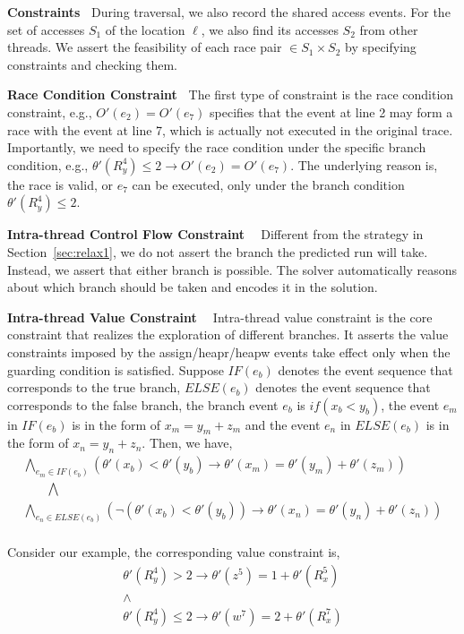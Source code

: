 {\bf Constraints\ } During traversal, we also record the shared access 
events.  For the set of accesses $S_1$ of the location $\ell$, we also 
find its accesses $S_2$ from other threads. We assert the feasibility 
of each race pair $\in S_1 \times S_2$ by specifying constraints and 
checking them.

{\bf Race Condition Constraint\ }  The first type of constraint is the 
race condition constraint, e.g., $O'(e_2)=O'(e_7)$ specifies that the event 
at line 2 may form a race with the event at line 7, which is actually not 
executed in the original trace. Importantly, we need to specify the race 
condition under the specific branch condition, e.g., 
$\theta'(R^4_y)\leq 2\rightarrow O'(e_2)=O'(e_7)$. The underlying reason is, 
the race is valid, or $e_7$ can be executed,  only under the branch condition $\theta'(R^4_y)\leq 2$. 

{\bf Intra-thread Control Flow Constraint \ } Different from the strategy in Section~\ref{sec:relax1}, we do not assert the branch the predicted run will take. Instead, we assert that either branch is possible.
The solver automatically reasons about which branch should be taken and encodes it in the solution. 

{\bf Intra-thread Value Constraint \ } Intra-thread value constraint is the 
core constraint that realizes the exploration of different branches. It 
asserts the value constraints imposed by the {\sf assign/heapr/heapw} events 
take effect only when the guarding condition is satisfied. 
Suppose $IF(e_b)$ denotes the event sequence that corresponds to the 
true branch, $ELSE(e_b)$ denotes the event sequence that corresponds to 
the false branch, the branch event $e_b$ is  $if(x_b<y_b)$, the event $e_m$ 
in $IF(e_b)$ is in the form of $x_m=y_m+z_m$ and the 
event $e_n$ in $ELSE(e_b)$ is in the form of $x_n=y_n+z_n$. Then, we have,
$$
\begin{array}{l}
\bigwedge\limits_{e_m \in IF(e_b)} (\theta'(x_b) < \theta'(y_b) \rightarrow  \theta'(x_m)=\theta'(y_m)+\theta'(z_m)) \\ 
\quad \quad  \bigwedge  \\
\bigwedge\limits_{e_n \in ELSE(e_b)} (\neg(\theta'(x_b)  < \theta'(y_b)) \rightarrow  \theta'(x_n)=\theta'(y_n)+\theta'(z_n)) \\ 
\end{array}
$$


Consider our example, the corresponding value constraint is, 
$$
\begin{array}{l}
\theta'(R^4_y)>2 \rightarrow \theta'(z^5)=1+\theta'(R^5_x) \\ 
\wedge  \\
\theta'(R^4_y)\leq 2 \rightarrow  \theta'(w^7)=2+\theta'(R^{7}_{x})\\
\end{array}
$$

